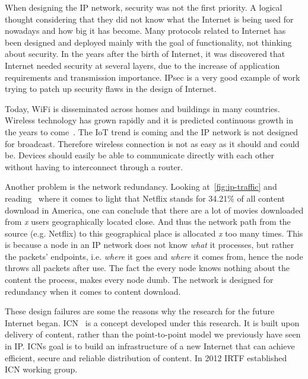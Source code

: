 When designing the \gls{IP} network, security was not the first priority.
A logical thought considering that they did not know what the Internet is being used for nowadays and how big it has become.
Many protocols related to Internet has been designed and deployed mainly with the goal of functionality, not thinking about security.
In the years after the birth of Internet, it was discovered that Internet needed security at several layers, due to the increase of application requirements and transmission importance.
\gls{IPsec} is a very good example of work trying to patch up security flaws in the design of Internet.

Today, WiFi is disseminated across homes and buildings in many countries. 
Wireless technology has grown rapidly and it is predicted continuous growth in the years to come~\cite{DBLP:journals/jthtl/Rosston14}. 
The \gls{IoT} trend is coming and the \gls{IP} network is not designed for broadcast.
Therefore wireless connection is not as easy as it should and could be.
Devices should easily be able to communicate directly with each other without having to interconnect through a router.

Another problem is the network redundancy. 
Looking at~\autoref{fig:ip-traffic} and reading~\cite{gipr2014} where it comes to light that Netflix stands for 34.21\% of all content download in America, one can conclude that there are a lot of movies downloaded from \textit{x} users geographically located close.
And thus the network path from the source (e.g. Netflix) to this geographical place is allocated \textit{x} too many times. 
This is because a node in an \gls{IP} network does not know \textit{what} it processes, but rather the packets' endpoints, i.e. \textit{where} it goes and \textit{where} it comes from, hence the node throws all packets after use. 
The fact the every node knows nothing about the content the process, makes every node dumb.
The network is designed for redundancy when it comes to content download.

These design failures are some the reasons why the research for the future Internet began.  
\gls{ICN}~\cite{DBLP:journals/cm/AhlgrenDIKO12} is a concept developed under this research.
It is built upon delivery of content, rather than the point-to-point model we previously have seen in \gls{IP}.
\gls{ICN}s goal is to build an infrastructure of a new Internet that can achieve efficient, secure and reliable distribution of content.
In 2012 \gls{IRTF} established \gls{ICN} working group.


